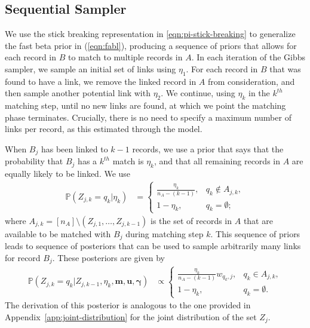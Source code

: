 \documentclass[12pt,letterpaper]{article}
\newcommand{\1}[1]{\mathbb{I}\!\left[#1\right]} %
\def \brian#1{{\color{red} (#1)}}
\begin{document}

\subsection{Sequential Sampler} \label{sec:sequential-sampler} 

We use the stick breaking representation in \eqref{eqn:pi-stick-breaking} to generalize the fast beta prior in (\ref{eqn:fabl}), producing a sequence of priors that allows for each record in $B$ to match to multiple records in $A$. In each iteration of the Gibbs sampler, we sample an initial set of links using $\eta_1$. For each record in $B$ that was found to have a link, we remove the linked record in $A$ from consideration, and then sample another potential link with $\eta_2$. We continue, using $\eta_k$ in the $k^{th}$ matching step, until no new links are found, at which we point the matching phase terminates. Crucially, there is no need to specify a maximum number of links per record, as this estimated through the model. 

When $B_j$ has been linked to $k-1$ records, we use a prior that says that the probability that $B_j$ has a $k^{th}$ match is $\eta_k$, and that all remaining records in $A$ are equally likely to be linked. We use
\begin{align*} %
	\mathbb{P}(Z_{j, k} = q_k|\eta_k) &= \begin{cases}
		\frac{\eta_k}{n_A - (k - 1)}, &  q_k \notin A_{j, k}, \\
		1 - \eta_k, & q_k = \emptyset;
	\end{cases}
\end{align*}
where $A_{j, k} = [n_A] \setminus (Z_{j, 1}, \ldots, Z_{j, k-1})$ is the set of records in $A$ that are available to be matched with $B_j$ during matching step $k$. This sequence of priors leads to sequence of posteriors that can be used to sample arbitrarily many links for record $B_j$. These posteriors are given by 
\begin{align} \label{eqn:sequential_posterior}
	\mathbb{P}(Z_{j, k} = q_k|Z_{j, k-1}, \eta_k, \bm{m}, \bm{u}, \bm{\gamma}) &\propto \begin{cases}
		\frac{\eta_k}{n_A - (k - 1)} w_{q_k, j}, & q_k \in A_{j, k}, \\
		1 - \eta_k, & q_k= \emptyset.
	\end{cases}
\end{align}
The derivation of this posterior is analogous to the one provided in Appendix~\ref{app:joint-distribution} for the joint distribution of the set $Z_j$.
\end{document}

